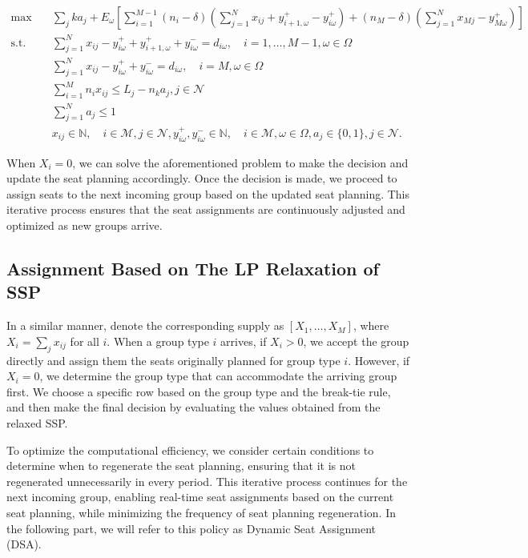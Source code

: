 \begin{equation}\label{adjusted_SSP}
  \begin{aligned}
  \max \quad & \sum_{j} k a_j + E_{\omega}\left[\sum_{i=1}^{M-1} (n_i-\delta) (\sum_{j= 1}^{N} x_{ij} + y_{i+1,\omega}^{+} - y_{i \omega}^{+}) + (n_{M}-\delta) (\sum_{j= 1}^{N} x_{Mj} - y_{M \omega}^{+})\right] \\
  \text {s.t.} \quad & \sum_{j= 1}^{N} x_{ij}-y_{i \omega}^{+}+
  y_{i+1, \omega}^{+} + y_{i \omega}^{-}=d_{i \omega}, \quad i = 1,\ldots,M-1, \omega \in \Omega \\
  & \sum_{j= 1}^{N} x_{ij} -y_{i \omega}^{+}+y_{i \omega}^{-}=d_{i \omega}, \quad i = M, \omega \in \Omega \\
  & \sum_{i=1}^{M} n_{i} x_{ij} \leq L_j - n_k a_j, j \in \mathcal{N} \\
  & \sum_{j=1}^{N} a_j \leq 1 \\
  & x_{ij} \in \mathbb{N}, \quad i \in \mathcal{M}, j \in \mathcal{N}, y_{i \omega}^{+}, y_{i \omega}^{-} \in \mathbb{N}, \quad i \in \mathcal{M}, \omega \in \Omega,  a_j \in \{0,1\}, j \in \mathcal{N}.
  \end{aligned}
\end{equation}

When $X_i = 0$, we can solve the aforementioned problem to make the decision and update the seat planning accordingly. Once the decision is made, we proceed to assign seats to the next incoming group based on the updated seat planning. This iterative process ensures that the seat assignments are continuously adjusted and optimized as new groups arrive.


\subsection{Assignment Based on The LP Relaxation of SSP}
In a similar manner, denote the corresponding supply as $[X_1, \ldots, X_M]$, where $X_i = \sum_{j} x_{ij}$ for all $i$. When a group type $i$ arrives, if $X_i > 0$, we accept the group directly and assign them the seats originally planned for group type $i$. However, if $X_i = 0$, we determine the group type that can accommodate the arriving group first. We choose a specific row based on the group type and the break-tie rule, and then make the final decision by evaluating the values obtained from the relaxed SSP.

To optimize the computational efficiency, we consider certain conditions to determine when to regenerate the seat planning, ensuring that it is not regenerated unnecessarily in every period. This iterative process continues for the next incoming group, enabling real-time seat assignments based on the current seat planning, while minimizing the frequency of seat planning regeneration. In the following part, we will refer to this policy as Dynamic Seat Assignment (DSA).


